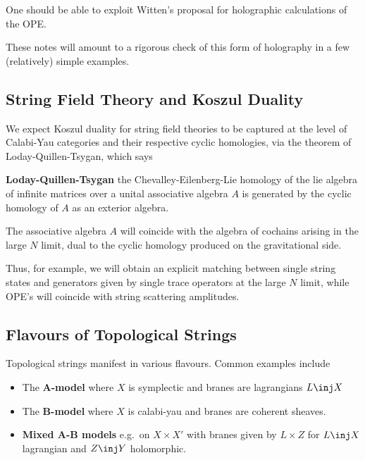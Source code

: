 \documentclass[12pt]{amsart}
\begin{document}
  \begin{rmk}
    One should be able to exploit Witten's proposal for holographic
    calculations of the OPE.
  \end{rmk}

  These notes will amount to a rigorous check of this form of holography in a
  few (relatively) simple examples.

  \subsection{String Field Theory and Koszul Duality}
  We expect Koszul duality for string field theories to be captured at the
  level of Calabi-Yau categories and their respective cyclic homologies, via
  the theorem of Loday-Quillen-Tsygan, which says
  \begin{thm}
    \textbf{Loday-Quillen-Tsygan} the Chevalley-Eilenberg-Lie homology of the
    lie algebra of infinite matrices over a unital associative algebra $A$ is
    generated by the cyclic homology of $A$ as an exterior algebra.
  \end{thm}

  The associative algebra $A$ will coincide with the algebra of cochains arising in the
  large $N$ limit, dual to the cyclic homology produced on the gravitational
  side.\par

  Thus, for example, we will obtain an explicit matching between single string states and
  generators given by single trace operators\footnotemark{} at the large $N$ limit, while OPE's will coincide with
  string scattering amplitudes.

  \subsection{Flavours of Topological Strings}
  Topological strings manifest in various flavours. Common examples include

  \begin{itemize}
    \item The \textbf{A-model} where $X$ is symplectic and branes are
      lagrangians $L \inj X$
    \item The \textbf{B-model} where $X$ is calabi-yau and branes are coherent
      sheaves.
    \item \textbf{Mixed A-B models} e.g.\ on $X \times X'$ with branes given by
      $L\times Z$ for $L \inj X$ lagrangian and $Z \inj Y$ holomorphic.
  \end{itemize}
\end{document}
